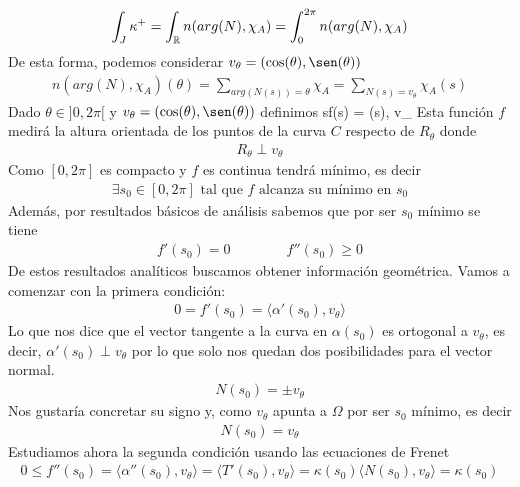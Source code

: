\begin{ejemplo}
    \begin{gather*}
        \int_J \kappa^+ = \int_{\mathbb{R}} n(arg(N), \chi_A) = \int_0^{2\pi} n(arg(N), \chi_A)
    \end{gather*}
    De esta forma, podemos considerar $v_\theta = (\cos(\theta), \sen(\theta))$
    \begin{gather*}
        n(arg(N), \chi_A)(\theta) = \sum_{arg(N(s))=\theta} \chi_A = \sum_{N(s)=v_\theta} \chi_A(s)
    \end{gather*}
    Dado $\theta\in]0,2\pi[$ y $v_\theta = (\cos(\theta), \sen(\theta))$ definimos 
         {s}{f(s) = \langle \alpha(s), v_\theta \rangle}
    Esta función $f$ medirá la altura orientada de los puntos de la curva $C$ respecto de $R_\theta$ donde
    \begin{gather*}
        R_\theta \perp v_\theta
    \end{gather*}
    Como $[0,2\pi]$ es compacto y $f$ es continua tendrá mínimo, es decir
    \begin{gather*}
        \exists s_0\in [0,2\pi] \text{ tal que $f$ alcanza su mínimo en $s_0$} 
    \end{gather*}
    Además, por resultados básicos de análisis sabemos que por ser $s_0$ mínimo se tiene
    \begin{gather*}
        f'(s_0)=0 \qquad \qquad f''(s_0)\geq 0
    \end{gather*}
    De estos resultados analíticos buscamos obtener información geométrica. 
    Vamos a comenzar con la primera condición:
    \begin{gather*}
        0=f'(s_0) = \langle \alpha'(s_0), v_\theta \rangle
    \end{gather*}
    Lo que nos dice que el vector tangente a la curva en $\alpha(s_0)$ es ortogonal a $v_\theta$, es decir, $\alpha'(s_0)\perp v_\theta$ por lo que solo nos quedan dos posibilidades para el vector normal. 
    \begin{gather*}
        N(s_0) = \pm v_\theta
    \end{gather*}
    Nos gustaría concretar su signo y, como $v_\theta$ apunta a $\Omega$ por ser $s_0$ mínimo, es decir
    \begin{gather*}
        N(s_0)=v_\theta
    \end{gather*}
    Estudiamos ahora la segunda condición usando las ecuaciones de Frenet
    \begin{gather*}
        0 \leq f''(s_0) = \langle \alpha''(s_0), v_\theta \rangle = \langle T'(s_0), v_\theta \rangle = \kappa(s_0)\langle N(s_0), v_\theta \rangle = \kappa(s_0)

\end{gather*}
\end{ejemplo}
